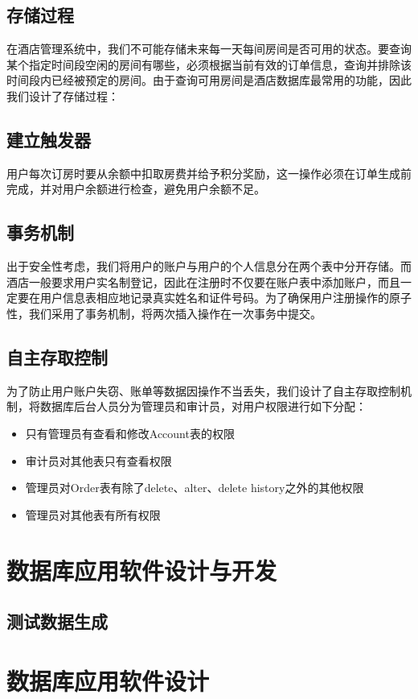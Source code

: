 \documentclass{myreport}
\begin{document}
\section{存储过程}
在酒店管理系统中，我们不可能存储未来每一天每间房间是否可用的状态。要查询某个指定时间段空闲的房间有哪些，必须根据当前有效的订单信息，查询并排除该时间段内已经被预定的房间。由于查询可用房间是酒店数据库最常用的功能，因此我们设计了存储过程：

\section{建立触发器}
用户每次订房时要从余额中扣取房费并给予积分奖励，这一操作必须在订单生成前完成，并对用户余额进行检查，避免用户余额不足。

\section{事务机制}
出于安全性考虑，我们将用户的账户与用户的个人信息分在两个表中分开存储。而酒店一般要求用户实名制登记，因此在注册时不仅要在账户表中添加账户，而且一定要在用户信息表相应地记录真实姓名和证件号码。为了确保用户注册操作的原子性，我们采用了事务机制，将两次插入操作在一次事务中提交。

\section{自主存取控制}
为了防止用户账户失窃、账单等数据因操作不当丢失，我们设计了自主存取控制机制，将数据库后台人员分为管理员和审计员，对用户权限进行如下分配： 
\begin{itemize}
    \item 只有管理员有查看和修改Account表的权限
    \item 审计员对其他表只有查看权限
    \item 管理员对Order表有除了delete、alter、delete history之外的其他权限
    \item 管理员对其他表有所有权限
\end{itemize}

\chapter{数据库应用软件设计与开发}
\section{测试数据生成}


\chapter{数据库应用软件设计}
\end{document}
